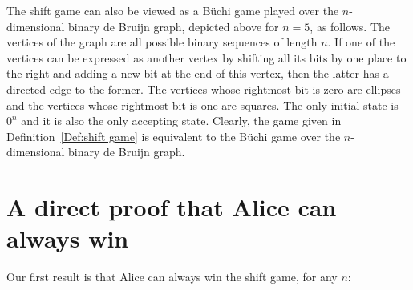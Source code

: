 \documentclass[final,12pt]{elsarticle}
\theoremstyle{definition} \newtheorem{definition}[theorem]{Definition} \newtheorem{observation}[theorem]{Observation} \newtheorem{example}[theorem]{Example} \newtheorem{remark}[theorem]{Remark} \newtheorem{corrolary}[theorem]{Corrolary}
\begin{document}
The shift game can also be viewed as a B\"uchi game played over the $n$-dimensional binary de Bruijn graph, depicted above for $n=5$, as follows. The vertices of the graph are all possible binary sequences of length $n$. If one of the vertices can be expressed as another vertex by shifting all its bits by one place to the right and adding a new bit at the end of this vertex, then the latter has a directed edge to the former. The vertices whose rightmost bit is zero are ellipses and the vertices whose rightmost bit is one are squares. The only initial state is $0^n$ and it is also the only accepting state. Clearly, the game given in Definition~\ref{Def:shift game} is equivalent to the B\"uchi game over the $n$-dimensional binary de Bruijn graph.

\section{A direct proof that Alice can always win} 
\label{sec:alice-wins}
Our first result is that Alice can always win the shift game, for any $n$:
\end{document}
